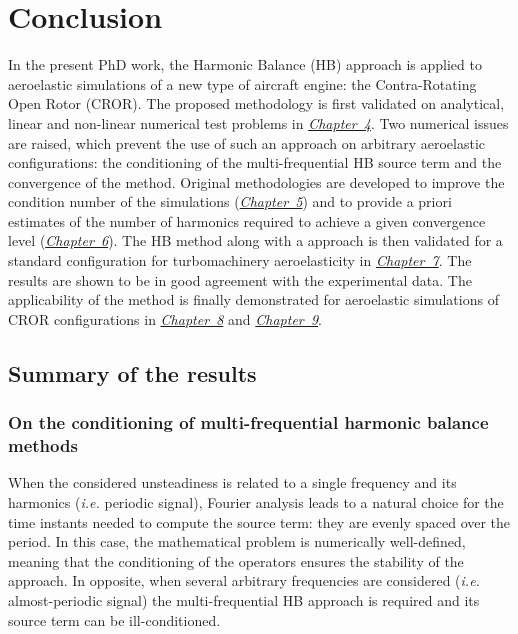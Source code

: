 
\chapter*{Conclusion}

In the present PhD work, the Harmonic Balance (HB) approach 
is applied to 
aeroelastic simulations of a new type of aircraft engine: 
the Contra-Rotating Open Rotor (CROR). The proposed methodology is
first validated on analytical, linear and non-linear 
numerical test problems in \hyperref[cha:validation_hb]{\emph{Chapter~4}}. 
Two numerical issues are raised, which prevent the use of such an approach 
on arbitrary aeroelastic configurations: the conditioning of
the multi-frequential HB source term and the
convergence of the method. Original methodologies are developed 
to improve the condition number of the simulations 
(\hyperref[cha:limitations_condition_number]{\emph{Chapter~5}})
and to provide a priori estimates of the number of harmonics 
required to achieve a given convergence level
(\hyperref[cha:limitations_convergence]{\emph{Chapter~6}}). 
The HB method along with a  approach
is then validated for a standard configuration 
for turbomachinery aeroelasticity in \hyperref[cha:stcf11]{\emph{Chapter~7}}. 
The results are shown to be in good agreement 
with the experimental data. The applicability of the method 
is finally demonstrated for aeroelastic 
simulations of CROR configurations
in \hyperref[cha:dream_ls_isolated]{\emph{Chapter~8}}
and \hyperref[cha:dream_hs_isolated]{\emph{Chapter~9}}.

\section*{Summary of the results}

\subsection*{On the conditioning of multi-frequential harmonic balance methods}

When the considered unsteadiness is related to a single frequency and its
harmonics (\emph{i.e.} periodic signal), 
Fourier analysis leads to a natural choice for the time instants
needed to compute the source term:
they are evenly spaced over the period. In this case, the mathematical
problem is numerically well-defined, meaning that the conditioning of
the operators ensures the stability of the approach.
In opposite, when several arbitrary frequencies are 
considered (\emph{i.e.} almost-periodic signal)
the multi-frequential HB approach
is required and its source term can be ill-conditioned.

